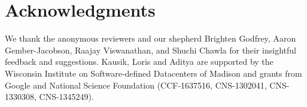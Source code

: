 \section*{Acknowledgments}
We thank the anonymous reviewers and our shepherd Brighten Godfrey, 
Aaron Gember-Jacobson, 
Raajay Viswanathan, and Shuchi Chawla 
for their insightful feedback and suggestions. 
Kausik, Loris and Aditya  
are supported by the Wisconsin Institute
on Software-defined Datacenters of Madison and 
grants from Google and National
Science Foundation (CCF-1637516, CNS-1302041, CNS-1330308, CNS-1345249).